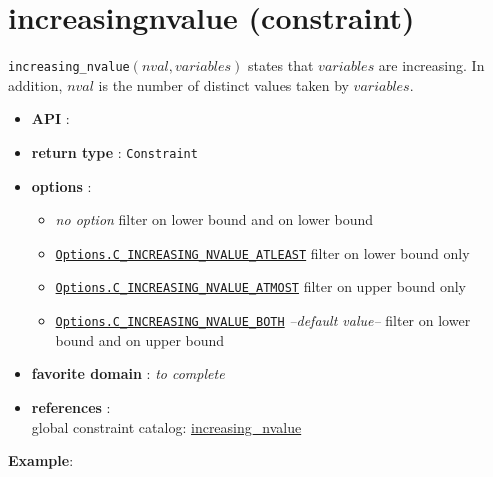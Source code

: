 \label{increasingnvalue}
\hypertarget{increasingnvalue}{}

\section{increasingnvalue (constraint)}\label{increasingnvalue:increasingnvalueconstraint}\hypertarget{increasingnvalue:increasingnvalueconstraint}{}
\begin{notedef}
  \texttt{increasing\_nvalue}$(nval, variables)$ states that $variables$ are increasing. In addition, $nval$ is the number of distinct values taken by $variables$.
\end{notedef}

\begin{itemize}
	\item \textbf{API} : 
	\item \textbf{return type} : \texttt{Constraint}
	\item \textbf{options} :
	\begin{itemize}
		\item \emph{no option} filter on lower bound and on lower bound
		\item \hyperlink{cinvatleast:cinvatleastoptions}{\tt Options.C\_INCREASING\_NVALUE\_ATLEAST} filter on lower bound only
		\item \hyperlink{cinvatmost:cinvatmostoptions}{\tt Options.C\_INCREASING\_NVALUE\_ATMOST} filter on upper bound only
		\item \hyperlink{cinvboth:cinvbothoptions}{\tt Options.C\_INCREASING\_NVALUE\_BOTH} \textit{--default value--} filter on lower bound and on upper bound
	\end{itemize}
	\item \textbf{favorite domain} : \emph{to complete}
	\item \textbf{references} :\\
      global constraint catalog: \href{http://www.emn.fr/x-info/sdemasse/gccat/Cincreasing_nvalue.html}{increasing\_nvalue}
\end{itemize}

\textbf{Example}:
 
